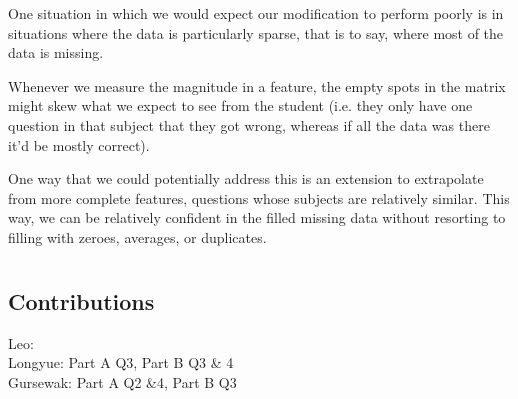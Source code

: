 \documentclass[twocolumn]{article}
\begin{document}
One situation in which we would expect our modification to perform poorly is in situations where the data is particularly sparse, that is to say, where most of the data is missing. 

Whenever we measure the magnitude in a feature, the empty spots in the matrix might skew what we expect to see from the student (i.e. they only have one question in that subject that they got wrong, whereas if all the data was there it’d be mostly correct).

One way that we could potentially address this is an extension to extrapolate from more complete features, questions whose subjects are relatively similar. This way, we can be relatively confident in the filled missing data without resorting to filling with zeroes, averages, or duplicates.

\section{}

\subsection{Contributions}
Leo: \\
Longyue: Part A Q3, Part B Q3 \& 4\\
Gursewak: Part A Q2 \&4, Part B Q3\\
\end{document}
